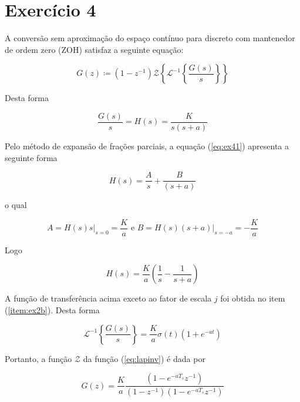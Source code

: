 \documentclass[twoside, fleqn]{article}
\begin{document}
\section*{Exercício 4}

    A conversão sem aproximação do espaço contínuo para discreto com mantenedor de ordem zero (ZOH) satisfaz a seguinte equação:
    
        \begin{equation}
            G(z) \coloneqq (1-z^{-1}) \mathcal{Z}\left\{\mathcal{L}^{-1}\left\{\frac{G(s)}{s}\right\}\right\}
        \end{equation}
    
    Desta forma
    
        \begin{equation}
            \frac{G(s)}{s} = H(s) = \frac{K}{s(s+a)}
            \label{eq:ex41}
        \end{equation}
    
    Pelo método de expansão de frações parciais, a equação (\ref{eq:ex41}) apresenta a seguinte forma
    
        \begin{equation}
            H(s) = \frac{A}{s} + \frac{B}{(s+a)} 
        \end{equation}
    
    o qual 
    
        \begin{equation}
            A = H(s) s \bigg\rvert_{s=0} = \frac{K}{a} \mbox{ e } B = H(s) (s+a)\bigg\rvert_{s=-a} = -\frac{K}{a}
        \end{equation}
    
    Logo
    
        \begin{equation}
            H(s) = \frac{K}{a} \left( \frac{1}{s} - \frac{1}{s+a} \right)
        \end{equation}
    
    A função de transferência acima exceto ao fator de escala $j$ foi obtida no item (\ref{item:ex2b}). Desta forma
    
        \begin{equation}
            \mathcal{L}^{-1}\left\{\frac{G(s)}{s}\right\} = \frac{K}{a}\sigma(t)\left(1+e^{-at}\right)
            \label{eq:lapinv}
        \end{equation}
    
    Portanto, a função $\mathcal{Z}$ da função (\ref{eq:lapinv}) é dada por
    
        \begin{equation}
            G(z) = \frac{K}{a} \frac{(1 - e^{-aT_s}z^{-1})}{(1-z^{-1})(1 - e^{-aT_s}z^{-1})}
        \end{equation}
    
\end{document}

